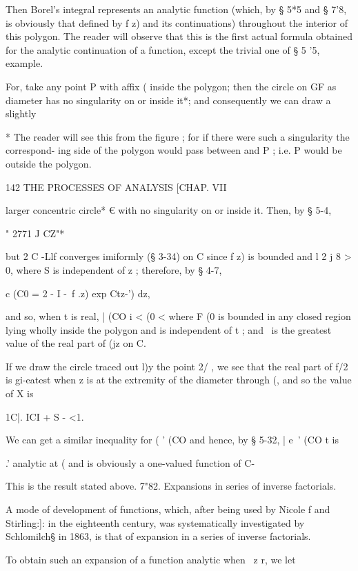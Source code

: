 {Then Borel's integral represents an analytic function (which, by § 5*5 and § 7'8, is 
obviously that defined by f z) and its continuations) throughout the interior of this 
polygon. The reader will observe that this is the first actual formula obtained for the 
analytic continuation of a function, except the trivial one of § 5 '5, example. 

For, take any point P with affix ( inside the polygon; then the circle on GF as 
diameter has no singularity on or inside it*; and consequently we can draw a slightly 

* The reader will see this from the figure ; for if there were such a singularity the correspond- 
ing side of the polygon would pass between and P ; i.e. P would be outside the polygon. 



142 THE PROCESSES OF ANALYSIS [CHAP. VII 

larger concentric circle* € with no singularity on or inside it. Then, by § 5-4, 

" 2771 J CZ"*  

but 2 C -Llf  converges imiformly (§ 3-34) on C since f z) is bounded and l 2 j   8 > 0, 
where S is independent of z ; therefore, by § 4-7, 

c  (C0 = 2 - I  -\ f .z) exp  Ctz-') dz, 

and so, when t is real, |   (CO i <   (0 <   where F (0 is bounded in any closed region lying 
wholly inside the polygon and is independent of t ; and \ is the greatest value of the 
real part of (jz on C. 

If we draw the circle traced out l)y the point 2/ , we see that the real part of f/2 is 
gi-eatest when z is at the extremity of the diameter through (, and so the value of X is 

1C|. ICI + S - <1. 

We can get a similar inequality for ( ' (CO and hence, by § 5-32, | e~' (CO  t is 

.' 
analytic at ( and is obviously a one-valued function of C- 

This is the result stated above. 
7"82. Expansions in series of inverse factorials. 

A mode of development of functions, which, after being used by Nicole f 
and Stirling:]: in the eighteenth century, was systematically investigated by 
Schlomilch§ in 1863, is that of expansion in a series of inverse factorials. 

To obtain such an expansion of a function analytic when \ z  r, we let 

}
